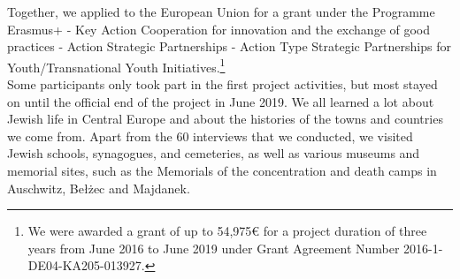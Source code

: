 Together, we applied to the European Union for a grant under the Programme Erasmus+ - Key Action Cooperation for innovation and the exchange of good practices - Action Strategic Partnerships - Action Type Strategic Partnerships for Youth/Transnational Youth Initiatives.\footnote{We were awarded a grant of up to 54,975\euro{} for a project duration of three years from June 2016 to June 2019 under Grant Agreement Number 2016-1-DE04-KA205-013927.} \\
Some participants only took part in the first project activities, but most stayed on until the official end of the project in June 2019. We all learned a lot about Jewish life in Central Europe and about the histories of the towns and countries we come from. Apart from the 60 interviews that we conducted, we visited Jewish schools, synagogues, and cemeteries, as well as various museums and memorial sites, such as the Memorials of the concentration and death camps in Auschwitz, Bełżec and Majdanek. 
